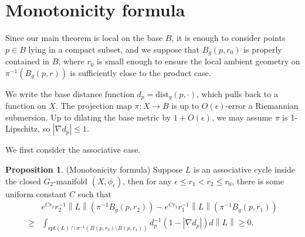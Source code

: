 \documentclass{article}
\theoremstyle{definition}
\newtheorem{prop}[thm]{Proposition}
\newcommand{\norm}[1]{\left\lVert#1\right\rVert}
\begin{document}
		
		
		
		
		
		
		
		
		
		
		
		
		
		
		

		

	

	
	
	
	
		
				\section{Monotonicity formula}\label{sect:monotonicity}
				
				
				
				
				Since our main theorem is local on the base $B$, it is enough to consider points $p\in B$ 
				lying in a compact subset, and we suppose that $B_g(p,r_0)$ is properly contained in $B$, where $r_0$ is small enough to ensure the local ambient geometry on $\pi^{-1}(B_g(p,r))$ is sufficiently close to the product case. 
				
				
				We write the base distance function $d_p= \text{dist}_g(p,\cdot)$, which pulls back to a function on $X$. The projection map $\pi: X\to B$ is up to $O(\epsilon)$-error a Riemannian submersion. Up to dilating the base metric by $1+ O(\epsilon)$, we may assume $\pi$ is 1-Lipschitz, so $|\nabla d_p|\leq 1$. 
				
				
	
				
				
				
				We first consider the associative case.
				
				
				\begin{prop}\label{prop:monotonicityassociative}
				(Monotonicity formula) Suppose $ L$ is an associative cycle inside the closed $G_2$-manifold $(X,\phi_\epsilon)$, then for any $\epsilon\leq r_1<r_2\leq r_0$, there is some uniform constant $C$ such that
				\[
				\begin{split}
					&	e^{Cr_2}	r_2^{-1} 	\norm{L}(  \pi^{-1}B_g(p, r_2)  )- e^{C r_1} r_1^{-1} 	\norm{L}(  \pi^{-1}B_g(p, r_1)  )
					\\
						\geq &  
					\int_{    \text{spt}(L) \cap \pi^{-1} (B(p,r_2)\setminus B(p,r_1) ) }  d_p^{-1} ( 1- |\nabla d_p| ) d\norm{ L}  \geq 0.
				\end{split}
				\]
				\end{prop}
				
\end{document}
